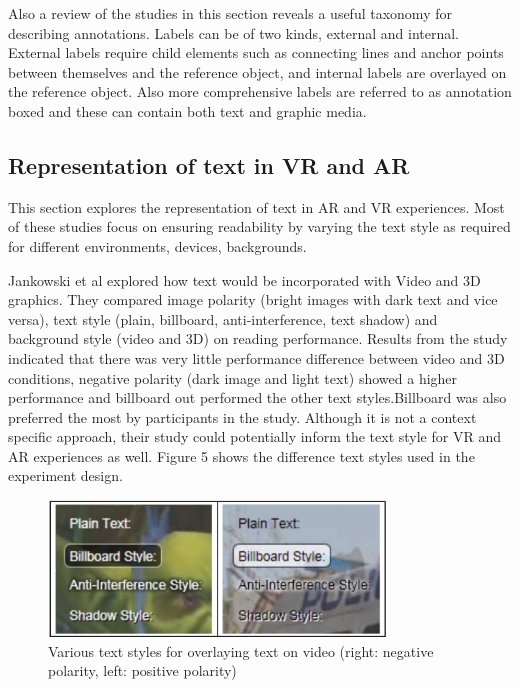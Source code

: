 \documentclass{article}
\begin{document}
Also a review of the studies in this section reveals a useful taxonomy for describing annotations. Labels can be of two kinds, external and internal. External labels require child elements such as connecting lines and anchor points between themselves and the reference object, and internal labels are overlayed on the reference object. Also more comprehensive labels are referred to as annotation boxed and these can contain both text and graphic media.

\subsection{Representation of text in VR and AR}
This section explores the representation of text in AR and VR experiences. Most of these studies focus on ensuring readability by varying the text style as required for different environments, devices, backgrounds. 

Jankowski et al \cite{Jankowski:2010:ITV:1753326.1753524} explored how text would be incorporated with Video and 3D graphics. They compared image polarity (bright images with dark text and vice versa), text style (plain, billboard, anti-interference, text shadow) and background style (video and 3D) on reading performance. Results from the study indicated that there was very little performance difference between video and 3D conditions, negative polarity (dark image and light text) showed a higher performance and  billboard out performed the other text styles.Billboard was also preferred the most by participants in the study. Although it is not a context specific approach, their study could potentially inform the text style for VR and AR experiences as well. Figure 5  shows the difference text styles used in the experiment design. 

\begin{figure}[htbp]
		\hspace*{0.15\textwidth}\includegraphics[width=0.8\textwidth]{Images/textStyles.jpg}
    	\caption{Various text styles for overlaying text on video (right: negative polarity, left: positive polarity)\cite{Jankowski:2010:ITV:1753326.1753524}}
\end{figure}
\end{document}
